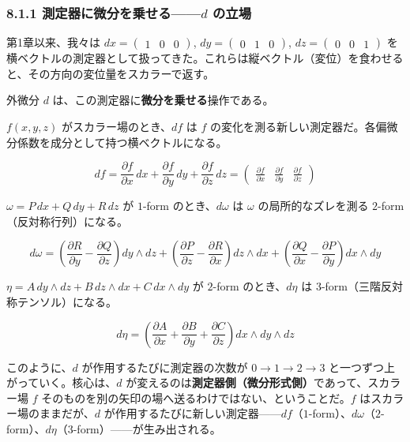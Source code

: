 \documentclass[a4paper,12pt,openany]{book}
\begin{document}
\hypertarget{ux6e2cux5b9aux5668ux306bux5faeux5206ux3092ux4e57ux305bux308bd-ux306eux7acbux5834}{%
\subsubsection{\texorpdfstring{8.1.1 測定器に微分を乗せる——\(d\)
の立場}{8.1.1 測定器に微分を乗せる——d の立場}}\label{ux6e2cux5b9aux5668ux306bux5faeux5206ux3092ux4e57ux305bux308bd-ux306eux7acbux5834}}

第1章以来、我々は \(dx = \begin{pmatrix}1&0&0\end{pmatrix}\),
\(dy = \begin{pmatrix}0&1&0\end{pmatrix}\),
\(dz = \begin{pmatrix}0&0&1\end{pmatrix}\)
を横ベクトルの測定器として扱ってきた。これらは縦ベクトル（変位）を食わせると、その方向の変位量をスカラーで返す。

外微分 \(d\) は、この測定器に\textbf{微分を乗せる}操作である。

\(f(x,y,z)\) がスカラー場のとき、\(df\) は \(f\)
の変化を測る新しい測定器だ。各偏微分係数を成分として持つ横ベクトルになる。

\[df = \frac{\partial f}{\partial x}\,dx + \frac{\partial f}{\partial y}\,dy + \frac{\partial f}{\partial z}\,dz = \begin{pmatrix} \frac{\partial f}{\partial x} & \frac{\partial f}{\partial y} & \frac{\partial f}{\partial z} \end{pmatrix}\]

\(\omega = P\,dx + Q\,dy + R\,dz\) が \(1\)-form のとき、\(d\omega\) は
\(\omega\) の局所的なズレを測る \(2\)-form（反対称行列）になる。

\[d\omega = \left(\frac{\partial R}{\partial y}-\frac{\partial Q}{\partial z}\right)dy\wedge dz + \left(\frac{\partial P}{\partial z}-\frac{\partial R}{\partial x}\right)dz\wedge dx + \left(\frac{\partial Q}{\partial x}-\frac{\partial P}{\partial y}\right)dx\wedge dy\]

\(\eta = A\,dy\wedge dz + B\,dz\wedge dx + C\,dx\wedge dy\) が
\(2\)-form のとき、\(d\eta\) は \(3\)-form（三階反対称テンソル）になる。

\[d\eta = \left(\frac{\partial A}{\partial x} + \frac{\partial B}{\partial y} + \frac{\partial C}{\partial z}\right) dx\wedge dy\wedge dz\]

このように、\(d\) が作用するたびに測定器の次数が \(0\to1\to2\to3\)
と一つずつ上がっていく。核心は、\(d\)
が変えるのは\textbf{測定器側（微分形式側）}であって、スカラー場 \(f\)
そのものを別の矢印の場へ送るわけではない、ということだ。\(f\)
はスカラー場のままだが、\(d\)
が作用するたびに新しい測定器——\(df\)（\(1\)-form）、\(d\omega\)（\(2\)-form）、\(d\eta\)（\(3\)-form）——が生み出される。
\end{document}
